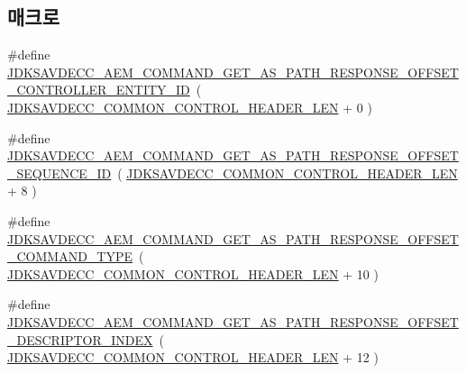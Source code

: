 \subsection*{매크로}
\begin{DoxyCompactItemize}
\item 
\#define \hyperlink{group__command__get__as__path__response_gafad90528502d9004cec7392c98d5a112}{J\+D\+K\+S\+A\+V\+D\+E\+C\+C\+\_\+\+A\+E\+M\+\_\+\+C\+O\+M\+M\+A\+N\+D\+\_\+\+G\+E\+T\+\_\+\+A\+S\+\_\+\+P\+A\+T\+H\+\_\+\+R\+E\+S\+P\+O\+N\+S\+E\+\_\+\+O\+F\+F\+S\+E\+T\+\_\+\+C\+O\+N\+T\+R\+O\+L\+L\+E\+R\+\_\+\+E\+N\+T\+I\+T\+Y\+\_\+\+ID}~( \hyperlink{group__jdksavdecc__avtp__common__control__header_gaae84052886fb1bb42f3bc5f85b741dff}{J\+D\+K\+S\+A\+V\+D\+E\+C\+C\+\_\+\+C\+O\+M\+M\+O\+N\+\_\+\+C\+O\+N\+T\+R\+O\+L\+\_\+\+H\+E\+A\+D\+E\+R\+\_\+\+L\+EN} + 0 )
\item 
\#define \hyperlink{group__command__get__as__path__response_gae67622bb1082129393c6415878b53496}{J\+D\+K\+S\+A\+V\+D\+E\+C\+C\+\_\+\+A\+E\+M\+\_\+\+C\+O\+M\+M\+A\+N\+D\+\_\+\+G\+E\+T\+\_\+\+A\+S\+\_\+\+P\+A\+T\+H\+\_\+\+R\+E\+S\+P\+O\+N\+S\+E\+\_\+\+O\+F\+F\+S\+E\+T\+\_\+\+S\+E\+Q\+U\+E\+N\+C\+E\+\_\+\+ID}~( \hyperlink{group__jdksavdecc__avtp__common__control__header_gaae84052886fb1bb42f3bc5f85b741dff}{J\+D\+K\+S\+A\+V\+D\+E\+C\+C\+\_\+\+C\+O\+M\+M\+O\+N\+\_\+\+C\+O\+N\+T\+R\+O\+L\+\_\+\+H\+E\+A\+D\+E\+R\+\_\+\+L\+EN} + 8 )
\item 
\#define \hyperlink{group__command__get__as__path__response_ga6c848529dd7ec1d6c8122a83db6f950d}{J\+D\+K\+S\+A\+V\+D\+E\+C\+C\+\_\+\+A\+E\+M\+\_\+\+C\+O\+M\+M\+A\+N\+D\+\_\+\+G\+E\+T\+\_\+\+A\+S\+\_\+\+P\+A\+T\+H\+\_\+\+R\+E\+S\+P\+O\+N\+S\+E\+\_\+\+O\+F\+F\+S\+E\+T\+\_\+\+C\+O\+M\+M\+A\+N\+D\+\_\+\+T\+Y\+PE}~( \hyperlink{group__jdksavdecc__avtp__common__control__header_gaae84052886fb1bb42f3bc5f85b741dff}{J\+D\+K\+S\+A\+V\+D\+E\+C\+C\+\_\+\+C\+O\+M\+M\+O\+N\+\_\+\+C\+O\+N\+T\+R\+O\+L\+\_\+\+H\+E\+A\+D\+E\+R\+\_\+\+L\+EN} + 10 )
\item 
\#define \hyperlink{group__command__get__as__path__response_ga137dcc44dbf830afd3daaaf04c76ddf1}{J\+D\+K\+S\+A\+V\+D\+E\+C\+C\+\_\+\+A\+E\+M\+\_\+\+C\+O\+M\+M\+A\+N\+D\+\_\+\+G\+E\+T\+\_\+\+A\+S\+\_\+\+P\+A\+T\+H\+\_\+\+R\+E\+S\+P\+O\+N\+S\+E\+\_\+\+O\+F\+F\+S\+E\+T\+\_\+\+D\+E\+S\+C\+R\+I\+P\+T\+O\+R\+\_\+\+I\+N\+D\+EX}~( \hyperlink{group__jdksavdecc__avtp__common__control__header_gaae84052886fb1bb42f3bc5f85b741dff}{J\+D\+K\+S\+A\+V\+D\+E\+C\+C\+\_\+\+C\+O\+M\+M\+O\+N\+\_\+\+C\+O\+N\+T\+R\+O\+L\+\_\+\+H\+E\+A\+D\+E\+R\+\_\+\+L\+EN} + 12 )

\end{DoxyCompactItemize}
